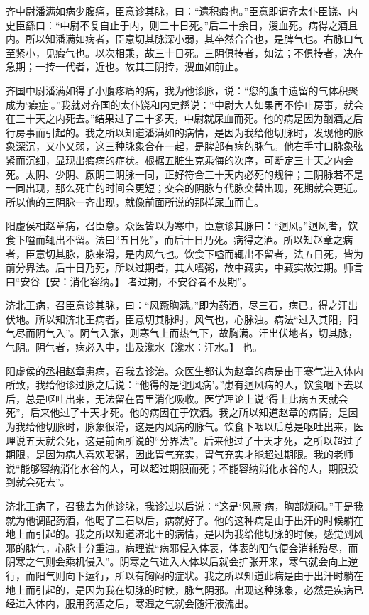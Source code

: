 \documentclass[12pt,UTF8]{ctexbook}
\begin{document}
齐中尉潘满如病少腹痛，臣意诊其脉，曰：“遗积瘕也。”臣意即谓齐太仆臣饶、内史臣繇曰：“中尉不复自止于内，则三十日死。”后二十余日，溲血死。病得之酒且内。所以知潘满如病者，臣意切其脉深小弱，其卒然合合也，是脾气也。右脉口气至紧小，见瘕气也。以次相乘，故三十日死。三阴俱抟者，如法；不俱抟者，决在急期；一抟一代者，近也。故其三阴抟，溲血如前止。

齐国中尉潘满如得了小腹疼痛的病，我为他诊脉，说：“您的腹中遗留的气体积聚成为‘瘕症’。”我就对齐国的太仆饶和内史繇说：“中尉大人如果再不停止房事，就会在三十天之内死去。”结果过了二十多天，中尉就尿血而死。他的病是因为酗酒之后行房事而引起的。我之所以知道潘满如的病情，是因为我给他切脉时，发现他的脉象深沉，又小又弱，这三种脉象合在一起，是脾部有病的脉气。他右手寸口脉象弦紧而沉细，显现出瘕病的症状。根据五脏生克乘侮的次序，可断定三十天之内会死。太阴、少阴、厥阴三阴脉一同，正好符合三十天内必死的规律；三阴脉若不是一同出现，那么死亡的时间会更短；交会的阴脉与代脉交替出现，死期就会更近。所以他的三阴脉一齐出现，就像前面所说的那样尿血而亡。

阳虚侯相赵章病，召臣意。众医皆以为寒中，臣意诊其脉曰：“迵风。”迵风者，饮食下嗌而辄出不留。法曰“五日死”，而后十日乃死。病得之酒。所以知赵章之病者，臣意切其脉，脉来滑，是内风气也。饮食下嗌而辄出不留者，法五日死，皆为前分界法。后十日乃死，所以过期者，其人嗜粥，故中藏实，中藏实故过期。师言曰“安谷【安：消化容纳。】 者过期，不安谷者不及期”。

济北王病，召臣意诊其脉，曰：“风蹶胸满。”即为药酒，尽三石，病已。得之汗出伏地。所以知济北王病者，臣意切其脉时，风气也，心脉浊。病法“过入其阳，阳气尽而阴气入”。阴气入张，则寒气上而热气下，故胸满。汗出伏地者，切其脉，气阴。阴气者，病必入中，出及瀺水【瀺水：汗水。】 也。

阳虚侯的丞相赵章患病，召我去诊治。众医生都认为赵章的病是由于寒气进入体内所致，我给他诊过脉之后说：“他得的是‘迵风病’。”患有迵风病的人，饮食咽下去以后，总是呕吐出来，无法留在胃里消化吸收。医学理论上说“得上此病五天就会死”，后来他过了十天才死。他的病因在于饮洒。我之所以知道赵章的病情，是因为我给他切脉时，脉象很滑，这是内风病的脉气。饮食下咽以后总是呕吐出来，医理说五天就会死，这是前面所说的“分界法”。后来他过了十天才死，之所以超过了期限，是因为病人喜欢喝粥，因此胃气充实，胃气充实才能超过期限。我的老师说“能够容纳消化水谷的人，可以超过期限而死；不能容纳消化水谷的人，期限没到就会死去”。

济北王病了，召我去为他诊脉，我诊过以后说：“这是‘风厥’病，胸部烦闷。”于是我就为他调配药酒，他喝了三石以后，病就好了。他的这种病是由于出汗的时候躺在地上而引起的。我之所以知道济北王的病情，是因为我给他切脉的时候，感觉到风邪的脉气，心脉十分重浊。病理说“病邪侵入体表，体表的阳气便会消耗殆尽，而阴寒之气则会乘机侵入”。阴寒之气进入人体以后就会扩张开来，寒气就会向上逆行，而阳气则向下运行，所以有胸闷的症状。我之所以知道此病是由于出汗时躺在地上而引起的，是因为我在切脉的时候，脉气阴邪。出现这种脉象，必然是疾病已经进入体内，服用药酒之后，寒湿之气就会随汗液流出。
\end{document}
